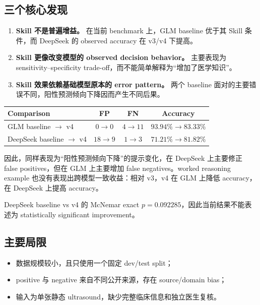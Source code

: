 \documentclass[11pt,a4paper]{ctexart}
\begin{document}
\subsection{三个核心发现}

\begin{enumerate}
    \item \textbf{Skill 不是普遍增益。} 在当前 benchmark 上，GLM baseline 优于其 Skill 条件，而 DeepSeek 的 observed accuracy 在 v3/v4 下提高。
    \item \textbf{Skill 更像改变模型的 observed decision behavior。} 主要表现为 sensitivity--specificity trade-off，而不能简单解释为“增加了医学知识”。
    \item \textbf{Skill 效果依赖基础模型原本的 error pattern。} 两个 baseline 面对的主要错误不同，阳性预测倾向下降因而产生不同后果。
\end{enumerate}

\begin{center}
\small
\begin{tabular}{lccc}
\toprule
Comparison & FP & FN & Accuracy \\
\midrule
GLM baseline $\rightarrow$ v4 & $0\rightarrow0$ & $4\rightarrow11$ & $93.94\%\rightarrow83.33\%$ \\
DeepSeek baseline $\rightarrow$ v4 & $18\rightarrow9$ & $1\rightarrow3$ & $71.21\%\rightarrow81.82\%$ \\
\bottomrule
\end{tabular}
\end{center}

因此，同样表现为“阳性预测倾向下降”的提示变化，在 DeepSeek 上主要修正 false positives，但在 GLM 上主要增加 false negatives。worked reasoning example 也没有表现出跨模型一致收益：相对 v3，v4 在 GLM 上降低 accuracy，在 DeepSeek 上提高 accuracy。

DeepSeek baseline vs v4 的 McNemar exact $p=0.092285$，因此当前结果不能表述为 statistically significant improvement。

\subsection{主要局限}

\begin{itemize}
    \item 数据规模较小，且只使用一个固定 dev/test split；
    \item positive 与 negative 来自不同公开来源，存在 source/domain bias；
    \item 输入为单张静态 ultrasound，缺少完整临床信息和独立医生复核。
\end{itemize}
\end{document}
